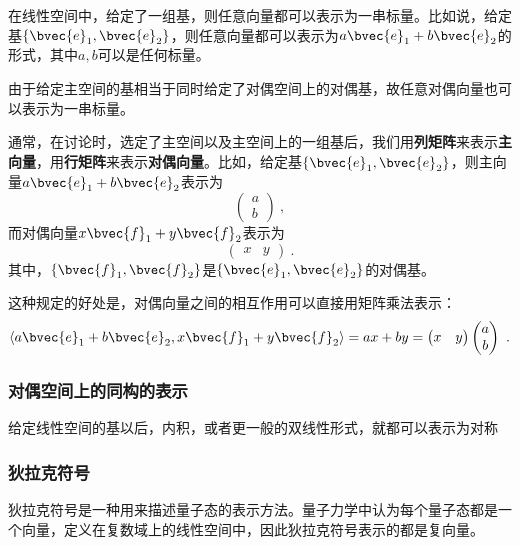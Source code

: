 在线性空间中，给定了一组基，则任意向量都可以表示为一串标量。比如说，给定基$\{\bvec{e}_1, \bvec{e}_2\}$，则任意向量都可以表示为$a\bvec{e}_1+b\bvec{e}_2$的形式，其中$a, b$可以是任何标量。


由于给定主空间的基相当于同时给定了对偶空间上的对偶基，故任意对偶向量也可以表示为一串标量。


通常，在讨论时，选定了主空间以及主空间上的一组基后，我们用\textbf{列矩阵}来表示\textbf{主向量}，用\textbf{行矩阵}来表示\textbf{对偶向量}。比如，给定基$\{\bvec{e}_1, \bvec{e}_2\}$，则主向量$a\bvec{e}_1+b\bvec{e}_2$表示为
\begin{equation}
\begin{pmatrix}
a\\
b
\end{pmatrix}~, 
\end{equation}
而对偶向量$x\bvec{f}_1+y\bvec{f}_2$表示为
\begin{equation}
\begin{pmatrix}
x&y
\end{pmatrix}~. 
\end{equation}
其中，$\{\bvec{f}_1, \bvec{f}_2\}$是$\{\bvec{e}_1, \bvec{e}_2\}$的对偶基。

这种规定的好处是，对偶向量之间的相互作用可以直接用矩阵乘法表示：
\begin{equation}
\langle a\bvec{e}_1+b\bvec{e}_2 , x\bvec{f}_1+y\bvec{f}_2 \rangle = ax+by = 
\begin{pmatrix}
x&y
\end{pmatrix}
\begin{pmatrix}
a\\
b
\end{pmatrix}~. 
\end{equation}




\subsubsection{对偶空间上的同构的表示}


给定线性空间的基以后，内积，或者更一般的双线性形式，就都可以表示为对称





\subsubsection{狄拉克符号}

狄拉克符号是一种用来描述量子态的表示方法。量子力学中认为每个量子态都是一个向量，定义在复数域上的线性空间中，因此狄拉克符号表示的都是复向量。

